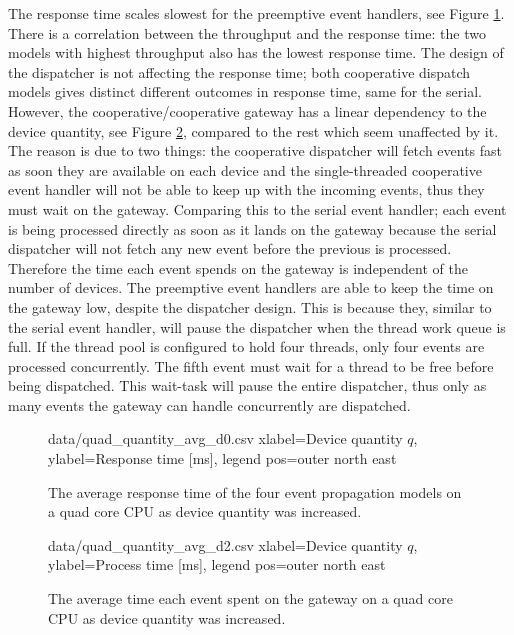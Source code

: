 The response time scales slowest for the preemptive event handlers, see Figure
\ref{fig:quad_quantity_avg_d0}. There is a correlation between the throughput
and the response time: the two models with highest throughput also has the
lowest response time. The design of the dispatcher is not affecting the
response time; both cooperative dispatch models gives distinct different
outcomes in response time, same for the serial. However, the
cooperative/cooperative gateway has a linear dependency to the device quantity,
see Figure \ref{fig:quad_quantity_avg_d2}, compared to the rest which seem
unaffected by it. The reason is due to two things: the cooperative dispatcher
will fetch events fast as soon they are available on each device and the
single-threaded cooperative event handler will not be able to keep up with the
incoming events, thus they must wait on the gateway. Comparing this to the
serial event handler; each event is being processed directly as soon as it
lands on the gateway because the serial dispatcher will not fetch any new event
before the previous is processed. Therefore the time each event spends on the
gateway is independent of the number of devices. The preemptive event handlers
are able to keep the time on the gateway low, despite the dispatcher design.
This is because they, similar to the serial event handler, will pause the
dispatcher when the thread work queue is full. If the thread pool is configured
to hold four threads, only four events are processed concurrently. The fifth
event must wait for a thread to be free before being dispatched. This wait-task
will pause the entire dispatcher, thus only as many events the gateway can
handle concurrently are dispatched.

\begin{figure}[h!]
    \centering
    \performanceplot
    {data/quad_quantity_avg_d0.csv}
    {
        xlabel=Device quantity $q$,
        ylabel={Response time [ms]},
        legend pos=outer north east
    }

    \caption[Response time result when device quantity was increased.]{The
    average response time of the four event propagation models on a quad core
    CPU as device quantity was increased.}

    \label{fig:quad_quantity_avg_d0}
\end{figure}

\begin{figure}[h!]
    \centering
    \performanceplot
    {data/quad_quantity_avg_d2.csv}
    {
        xlabel=Device quantity $q$,
        ylabel={Process time [ms]},
        legend pos=outer north east
    }

    \caption[Time spent on gateway when device quantity was increased.]{The
    average time each event spent on the gateway on a quad core CPU as device
    quantity was increased.}

    \label{fig:quad_quantity_avg_d2}
\end{figure}

